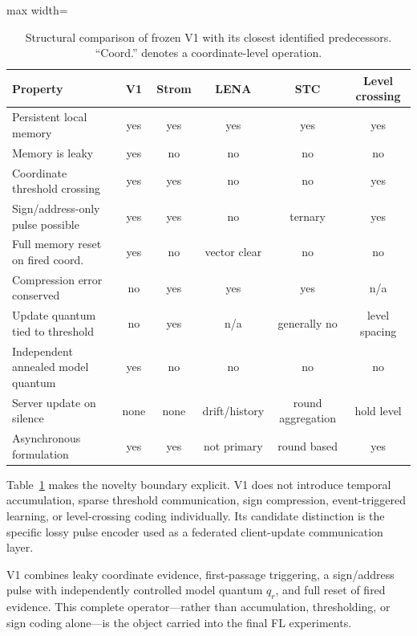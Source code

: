 \begin{table}[ht]
\centering
\small
\caption{Structural comparison of frozen V1 with its closest identified predecessors. ``Coord.'' denotes a coordinate-level operation.}
\label{tab:q1-structure}
\begin{adjustbox}{max width=\textwidth}
\begin{tabular}{p{3.6cm}ccccc}
\toprule
Property & V1 & Strom & LENA & STC & Level crossing\\
\midrule
Persistent local memory & yes & yes & yes & yes & yes\\
Memory is leaky & yes & no & no & no & no\\
Coordinate threshold crossing & yes & yes & no & no & yes\\
Sign/address-only pulse possible & yes & yes & no & ternary & yes\\
Full memory reset on fired coord. & yes & no & vector clear & no & no\\
Compression error conserved & no & yes & yes & yes & n/a\\
Update quantum tied to threshold & no & yes & n/a & generally no & level spacing\\
Independent annealed model quantum & yes & no & no & no & no\\
Server update on silence & none & none & drift/history & round aggregation & hold level\\
Asynchronous formulation & yes & yes & not primary & round based & yes\\
\bottomrule
\end{tabular}
\end{adjustbox}
\end{table}

Table~\ref{tab:q1-structure} makes the novelty boundary explicit. V1 does not introduce temporal accumulation, sparse threshold communication, sign compression, event-triggered learning, or level-crossing coding individually. Its candidate distinction is the specific lossy pulse encoder used as a federated client-update communication layer.
\begin{takeawaybox}[title={Q1 candidate distinction}]
V1 combines leaky coordinate evidence, first-passage triggering, a sign/address pulse with independently controlled model quantum $q_r$, and full reset of fired evidence. This complete operator---rather than accumulation, thresholding, or sign coding alone---is the object carried into the final FL experiments.
\end{takeawaybox}

